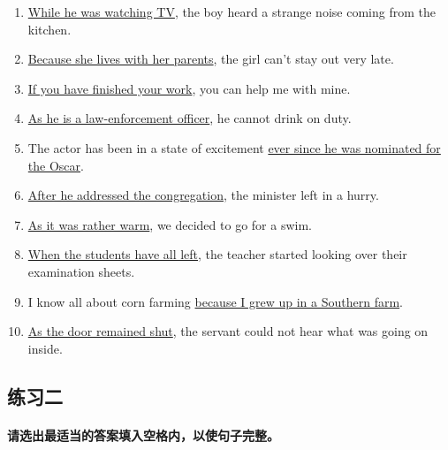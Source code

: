 \begin{enumerate}
\item \ul{While he was watching TV}, the boy heard a strange noise coming from
the kitchen.

\item \ul{Because she lives with her parents}, the girl can't stay out very
late.

\item \ul{If you have finished your work}, you can help me with mine.

\item \ul{As he is a law-enforcement officer}, he cannot drink on duty.


\item The actor has been in a state of excitement \ul{ever since he was
nominated for the Oscar}.

\item \ul{After he addressed the congregation}, the minister left in a hurry.

\item \ul{As it was rather warm}, we decided to go for a swim.

\item \ul{When the students have all left}, the teacher started looking over
their examination sheets.

\item I know all about corn farming \ul{because I grew up in a Southern farm}.

\item \ul{As the door remained shut}, the servant could not hear what was going
on inside.
\end{enumerate}

\subsection{练习二}

\paragraph{请选出最适当的答案填入空格内，以使句子完整。}

